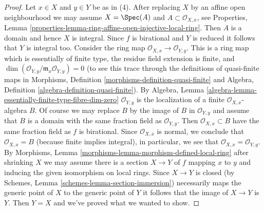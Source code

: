 \begin{proof}
\medskip\noindent
Let $x \in X$ and $y \in Y$ be as in (4). After replacing $X$
by an affine open neighbourhood we may assume $X = \Spec(A)$
and $A \subset \mathcal{O}_{X, x}$, see
Properties, Lemma \ref{properties-lemma-ring-affine-open-injective-local-ring}.
Then $A$ is a domain and hence $X$ is integral.
Since $f$ is birational and $Y$ is reduced
it follows that $Y$ is integral too. Consider the ring map
$\mathcal{O}_{X, x} \to \mathcal{O}_{Y, y}$. This is a ring map
which is essentially of finite type, the residue field extension
is finite, and $\dim(\mathcal{O}_{Y, y}/\mathfrak m_x\mathcal{O}_{Y, y}) = 0$
(to see this trace through the definitions of quasi-finite
maps in
Morphisms, Definition \ref{morphisms-definition-quasi-finite} and
Algebra, Definition \ref{algebra-definition-quasi-finite}). By
Algebra, Lemma \ref{algebra-lemma-essentially-finite-type-fibre-dim-zero}
$\mathcal{O}_{Y, y}$ is the localization of a finite
$\mathcal{O}_{X, x}$-algebra $B$. Of course we may replace
$B$ by the image of $B$ in $\mathcal{O}_{Y, y}$ and assume
that $B$ is a domain with the same fraction field as $\mathcal{O}_{Y, y}$.
Then $\mathcal{O}_{X, x} \subset B$
have the same fraction field as $f$ is birational. Since
$\mathcal{O}_{X, x}$ is normal, we conclude that
$\mathcal{O}_{X, x} = B$ (because finite implies integral),
in particular, we see that $\mathcal{O}_{X, x} = \mathcal{O}_{Y, y}$. By
Morphisms, Lemma \ref{morphisms-lemma-morphism-defined-local-ring}
after shrinking $X$ we may assume there is a section
$X \to Y$ of $f$ mapping $x$ to $y$ and inducing the given
isomorphism on local rings. Since $X \to Y$ is closed
(by Schemes, Lemma \ref{schemes-lemma-section-immersion})
necessarily maps the generic point of $X$ to the generic point of $Y$
it follows that the image of $X \to Y$ is $Y$.
Then $Y = X$ and we've proved what we wanted to show.
\end{proof}